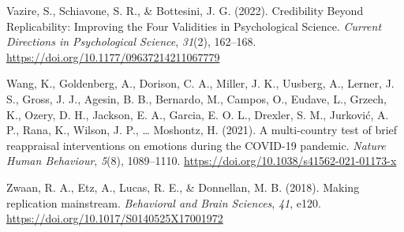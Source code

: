 \documentclass[
  man]{apa7}
\newlength{\cslhangindent}
\newlength{\cslentryspacingunit} %
\newenvironment{CSLReferences}[2] %
 {%
  \setlength{\parindent}{0pt}
  \ifodd #1
  \let\oldpar\par
  \def\par{\hangindent=\cslhangindent\oldpar}
  \fi
  \setlength{\parskip}{#2\cslentryspacingunit}
 }%
 {}
\begin{document}
\begin{CSLReferences}{1}{0}
\leavevmode{}%
Vazire, S., Schiavone, S. R., \& Bottesini, J. G. (2022). Credibility Beyond Replicability: Improving the Four Validities in Psychological Science. \emph{Current Directions in Psychological Science}, \emph{31}(2), 162--168. \url{https://doi.org/10.1177/09637214211067779}

\leavevmode{}%
Wang, K., Goldenberg, A., Dorison, C. A., Miller, J. K., Uusberg, A., Lerner, J. S., Gross, J. J., Agesin, B. B., Bernardo, M., Campos, O., Eudave, L., Grzech, K., Ozery, D. H., Jackson, E. A., Garcia, E. O. L., Drexler, S. M., Jurković, A. P., Rana, K., Wilson, J. P., \ldots{} Moshontz, H. (2021). A multi-country test of brief reappraisal interventions on emotions during the COVID-19 pandemic. \emph{Nature Human Behaviour}, \emph{5}(8), 1089--1110. \url{https://doi.org/10.1038/s41562-021-01173-x}

\leavevmode{}%
Zwaan, R. A., Etz, A., Lucas, R. E., \& Donnellan, M. B. (2018). Making replication mainstream. \emph{Behavioral and Brain Sciences}, \emph{41}, e120. \url{https://doi.org/10.1017/S0140525X17001972}

\end{CSLReferences}

\endgroup
\end{document}
